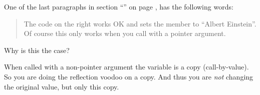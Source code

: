 \begin{Exercise}[title={Pointers and reflection},difficulty=5]
\label{ex:pointers and reflection}
\Question
One of the last paragraphs in section ``''
on page \pageref{sec:introspection and reflection}, has
the following words:
\begin{quote}
The code on the right works OK and sets the member 
to ``Albert Einstein''. Of course this only works when you call 
with a pointer argument.
\end{quote}
Why is this the case?
\end{Exercise}

\begin{Answer}
\Question
When called with a non-pointer argument the variable is a copy (call-by-value). So you
are doing the reflection voodoo on a copy. And thus you are \emph{not}
changing the original value, but only this copy.
\end{Answer}
